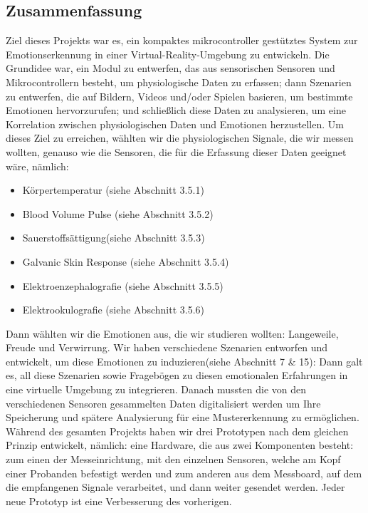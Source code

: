 \subsection{Zusammenfassung} \label{zusammenfassung-subsec}




Ziel dieses Projekts war es, ein kompaktes mikrocontroller gestütztes System zur Emotionserkennung in einer Virtual-Reality-Umgebung zu entwickeln. 
Die Grundidee war, ein Modul zu entwerfen, das aus sensorischen Sensoren und Mikrocontrollern besteht, um physiologische Daten zu erfassen; dann Szenarien zu entwerfen, die auf Bildern, Videos und/oder Spielen basieren, um bestimmte Emotionen hervorzurufen; und schließlich diese Daten zu analysieren, um eine Korrelation zwischen physiologischen Daten und Emotionen herzustellen.
Um dieses Ziel zu erreichen, wählten wir die physiologischen Signale, die wir messen wollten, genauso wie die Sensoren, die für die Erfassung dieser Daten geeignet wäre, nämlich: 
\begin{itemize} \setlength\itemsep{-0.15cm}
  \item Körpertemperatur (siehe Abschnitt 3.5.1) 
  \item Blood Volume Pulse (siehe Abschnitt 3.5.2) 
  \item Sauerstoffsättigung(siehe Abschnitt 3.5.3) 
  \item Galvanic Skin Response (siehe Abschnitt 3.5.4) 
  \item Elektroenzephalografie (siehe Abschnitt 3.5.5) 
  \item Elektrookulografie (siehe Abschnitt 3.5.6) 
\end{itemize}


Dann wählten wir die Emotionen aus, die wir studieren wollten: Langeweile, Freude und Verwirrung.  
Wir haben verschiedene Szenarien entworfen und entwickelt, um diese Emotionen zu induzieren(siehe Abschnitt 7 \& 15): Dann galt es, all diese Szenarien sowie Fragebögen zu diesen emotionalen Erfahrungen in eine virtuelle Umgebung zu integrieren. 
Danach mussten die von den verschiedenen Sensoren gesammelten Daten digitalisiert werden um Ihre Speicherung und spätere Analysierung für eine Mustererkennung zu ermöglichen.
Während des gesamten Projekts haben wir drei Prototypen nach dem gleichen Prinzip entwickelt, nämlich: 
eine Hardware, die aus zwei Komponenten besteht: 
zum einen der Messeinrichtung, mit den einzelnen Sensoren, welche am Kopf einer Probanden befestigt werden und zum anderen aus dem Messboard, auf dem die empfangenen Signale verarbeitet, und dann weiter gesendet werden. 
Jeder neue Prototyp ist eine Verbesserung des vorherigen. \\

